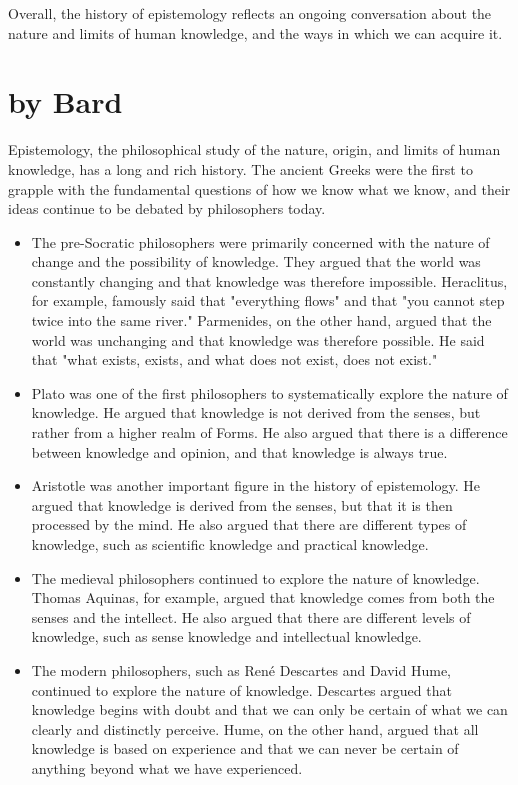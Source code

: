 \documentclass[10pt,titlepage]{book}
\begin{document}
Overall, the history of epistemology reflects an ongoing conversation about the nature and limits of human knowledge, and the ways in which we can acquire it.

\section{by Bard}

Epistemology, the philosophical study of the nature, origin, and limits of human knowledge, has a long and rich history. The ancient Greeks were the first to grapple with the fundamental questions of how we know what we know, and their ideas continue to be debated by philosophers today.

\begin{itemize}

  \item The pre-Socratic philosophers were primarily concerned with the nature of change and the possibility of knowledge. They argued that the world was constantly changing and that knowledge was therefore impossible. Heraclitus, for example, famously said that "everything flows" and that "you cannot step twice into the same river." Parmenides, on the other hand, argued that the world was unchanging and that knowledge was therefore possible. He said that "what exists, exists, and what does not exist, does not exist."

\item Plato was one of the first philosophers to systematically explore the nature of knowledge. He argued that knowledge is not derived from the senses, but rather from a higher realm of Forms. He also argued that there is a difference between knowledge and opinion, and that knowledge is always true.

\item Aristotle was another important figure in the history of epistemology. He argued that knowledge is derived from the senses, but that it is then processed by the mind. He also argued that there are different types of knowledge, such as scientific knowledge and practical knowledge.

\item The medieval philosophers continued to explore the nature of knowledge. Thomas Aquinas, for example, argued that knowledge comes from both the senses and the intellect. He also argued that there are different levels of knowledge, such as sense knowledge and intellectual knowledge.

\item The modern philosophers, such as René Descartes and David Hume, continued to explore the nature of knowledge. Descartes argued that knowledge begins with doubt and that we can only be certain of what we can clearly and distinctly perceive. Hume, on the other hand, argued that all knowledge is based on experience and that we can never be certain of anything beyond what we have experienced.
\end{itemize}
\end{document}
